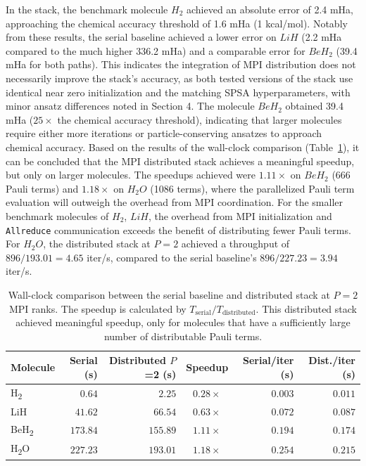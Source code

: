 In the stack, the benchmark molecule $H_{2}$ achieved an absolute error of 2.4 mHa, approaching the chemical accuracy threshold 
of 1.6 mHa (1 kcal/mol). Notably from these results, the serial baseline achieved a lower error on $LiH$ (2.2 mHa compared to the much higher 336.2 mHa) 
and a comparable error for $BeH_2$ (39.4 mHa for both paths). This indicates the integration of MPI distribution does not necessarily improve the stack's accuracy, as both tested versions of the 
stack use identical near zero initialization and the matching SPSA hyperparameters, with minor ansatz differences noted in Section 4.
 The molecule $BeH_{2}$ obtained 39.4 mHa ($25\times$ the chemical accuracy threshold), indicating that larger molecules require either more iterations or particle-conserving ansatzes to approach chemical accuracy.
Based on the results of the wall-clock comparison (Table~\ref{table:speedup}), it can be concluded that the MPI distributed stack achieves a meaningful speedup, 
but only on larger molecules. The speedups achieved were $1.11\times$ on $BeH_{2}$ (666 Pauli terms) and $1.18\times$ on $H_{2}O$ (1086 terms), where 
the parallelized Pauli term evaluation will outweigh the overhead from MPI coordination. For the smaller benchmark molecules of $H_{2}$, $LiH$, the 
overhead from MPI initialization and \texttt{Allreduce} communication exceeds the benefit of distributing fewer Pauli terms.
For $H_{2}O$, the distributed stack at $P=2$ achieved a throughput of $896 / 193.01 = 4.65$ iter/s, compared to the serial baseline's $896 / 227.23 = 3.94$ iter/s.

\begin{table}[htbp]
\centering
\renewcommand{\arraystretch}{1.2}
\caption{Wall-clock comparison between the serial baseline and distributed stack at $P=2$ MPI ranks. The speedup is calculated by $T_{\text{serial}} / T_{\text{distributed}}$. This distributed stack achieved meaningful speedup, only for molecules that have a sufficiently large number of distributable Pauli terms.}
\label{table:speedup}
\begin{tabular}{|l|r|r|c|r|r|}
\hline
\textbf{Molecule} & \textbf{Serial (s)} & \textbf{Distributed $P$=2 (s)} & \textbf{Speedup} & \textbf{Serial/iter (s)} & \textbf{Dist./iter (s)} \\ \hline
H\textsubscript{2} & $0.64$  & $2.25$  & $0.28\times$ & $0.003$ & $0.011$ \\ \hline
LiH & $41.62$ & $66.54$  & $0.63\times$ & $0.072$ & $0.087$ \\ \hline
BeH\textsubscript{2} & $173.84$ & $155.89$ & $\mathbf{1.11\times}$ & $0.194$ & $0.174$ \\ \hline
H\textsubscript{2}O & $227.23$ & $193.01$ & $\mathbf{1.18\times}$ & $0.254$ & $0.215$ \\ \hline
\end{tabular}
\end{table}

